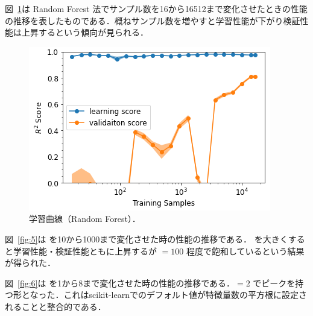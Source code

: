 \documentclass[10pt,a4paper,dvipdfmx]{jsarticle}
\begin{document}
図~\ref{fig:4}は Random Forest 法でサンプル数を16から16512まで変化させたときの性能の推移を表したものである．概ねサンプル数を増やすと学習性能が下がり検証性能は上昇するという傾向が見られる．

\begin{figure}[ht]
   \centering
   \includegraphics[keepaspectratio, width=0.45\linewidth]{2021-07-28-00-38-53.png}
   \caption{学習曲線（Random Forest）．}
   \label{fig:4}
\end{figure}

図~\ref{fig:5}は  を10から1000まで変化させた時の性能の推移である． を大きくすると学習性能・検証性能ともに上昇するが $=100$ 程度で飽和しているという結果が得られた．

図~\ref{fig:6}は  を1から8まで変化させた時の性能の推移である．$=2$ でピークを持つ形となった．これはscikit-learnでのデフォルト値が特徴量数の平方根に設定されることと整合的である．
\end{document}
